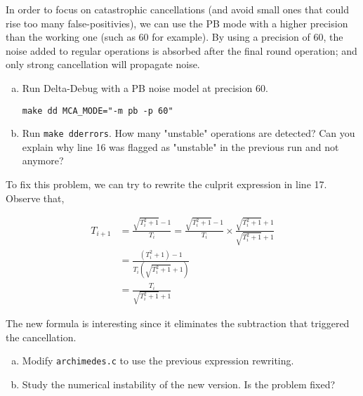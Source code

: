 In order to focus on catastrophic cancellations (and avoid small ones that could rise too many false-positivies), we can use the PB mode with a higher precision than the working one (such as 60 for example). By using a precision of 60, the noise added to regular operations is absorbed after the final round operation; and only strong cancellation will propagate noise.

\begin{question}
  \begin{enumerate}[(a)]
    \item Run Delta-Debug with a PB noise model at precision 60.
      \begin{verbatim}
make dd MCA_MODE="-m pb -p 60"
      \end{verbatim}
    \item Run \texttt{make dderrors}. How many "unstable" operations are detected?
      Can you explain why line 16 was flagged as "unstable" in the previous run and not anymore?
  \end{enumerate}
\end{question}

To fix this problem, we can try to rewrite the culprit expression in line 17.
Observe that,

\begin{align*}
  T_{i+1} &= \frac{\sqrt{T_i^2+1} - 1}{T_i} = \frac{\sqrt{T_i^2+1} - 1}{T_i} \times \frac{\sqrt{T_i^2+1} + 1}{\sqrt{T_i^2+1} + 1} \\
          &= \frac{(T_i^2 + 1) - 1}{T_i(\sqrt{T_i^2+1} + 1)} \\
          &= \frac{T_i}{\sqrt{T_i^2+1} + 1}
\end{align*}

The new formula is interesting since it eliminates the subtraction that triggered the cancellation.

\begin{question}
  \begin{enumerate}[(a)]
    \item Modify \texttt{archimedes.c} to use the previous expression rewriting.
    \item Study the numerical instability of the new version. Is the problem fixed?
  \end{enumerate}
\end{question}

